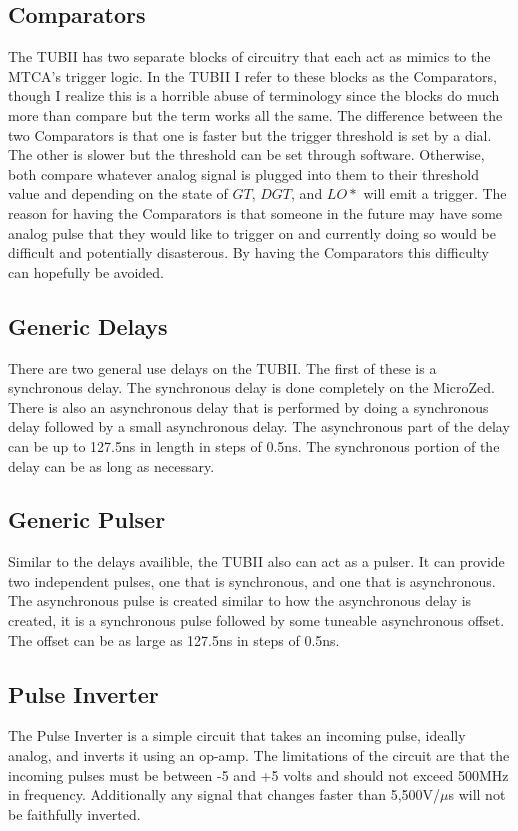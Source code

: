 \documentclass[11pt,a4paper]{article}
\begin{document}
\subsection{Comparators}
The TUBII has two separate blocks of circuitry that each act as mimics to the MTCA's  trigger logic. In the TUBII I refer to these blocks as the Comparators, though I realize this is a horrible abuse of terminology since the blocks do much more than compare but the term works all the same. The difference between the two Comparators is that one is faster but the trigger threshold is set by a dial. The other is slower but the threshold can be set through software. Otherwise, both compare whatever analog signal is plugged into them to their threshold value and depending on the state of $GT$, $DGT$, and $LO*$ will emit a trigger. The reason for having the Comparators is that someone in the future may have some analog pulse that they would like to trigger on and currently doing so would be difficult and potentially disasterous. By having the Comparators this difficulty can hopefully be avoided.
\subsection{Generic Delays}
There are two general use delays on the TUBII. The first of these is a synchronous delay. The synchronous delay is done completely on the MicroZed.  There is also an asynchronous delay that is performed by doing a synchronous delay followed by a small asynchronous delay. The asynchronous part of the delay can be up to 127.5ns in length in steps of 0.5ns. The synchronous portion of the delay can be as long as necessary.
\subsection{Generic Pulser}
Similar to the delays availible, the TUBII also can act as a pulser. It can provide two independent pulses, one that is synchronous, and one that is asynchronous. The asynchronous pulse is created similar to how the asynchronous delay is created, it is a synchronous pulse followed by some tuneable asynchronous offset. The offset can be as large as 127.5ns in steps of 0.5ns.
\subsection{Pulse Inverter}
The Pulse Inverter is a simple circuit that takes an incoming pulse, ideally analog, and inverts it using an op-amp. The limitations of the circuit are that the incoming pulses must be between -5 and +5 volts and should not exceed 500MHz in frequency. Additionally any signal that changes faster than 5,500V/$\mu$s will not be faithfully inverted.
\end{document}
